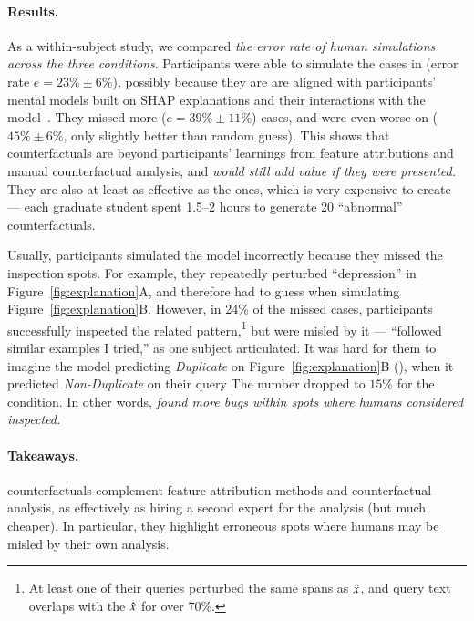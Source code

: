 \paragraph{Results.}
As a within-subject study, we compared \emph{the error rate of human simulations across the three conditions}.
Participants were able to simulate the cases in \crandom (error rate $e=23\%\pm6\%$), possibly because they are are aligned with participants' mental models built on SHAP explanations and their interactions with the model~\cite{miller}.
They missed more \chuman ($e=39\%\pm11\%$) cases, and were even worse on \cshap ($45\%\pm 6\%$, only slightly better than random guess).%
This shows that \cshap counterfactuals are beyond participants' learnings from feature attributions and manual counterfactual analysis, and \emph{would still add value if they were presented.}
They are also at least as effective as the \chuman ones, which is very expensive to create --- each graduate student spent 1.5--2 hours to generate 20 ``abnormal'' counterfactuals.

Usually, participants simulated the model incorrectly because they missed the inspection spots.
For example, they repeatedly perturbed ``depression'' in Figure~\ref{fig:explanation}A, and therefore had to guess when simulating Figure~\ref{fig:explanation}B.
However, in 24\% of the missed \cshap cases, participants successfully inspected the related pattern,\footnote{At least one of their queries perturbed the same spans as $\hat{x}$, and query text overlaps with the $\hat{x}$ for over 70\%.} but were misled by it --- ``followed similar examples I tried,'' as one subject articulated.
It was hard for them to imagine the model predicting \emph{Duplicate} on Figure~\ref{fig:explanation}B (), when it predicted \emph{Non-Duplicate} on their query 
The number dropped to $15\%$ for the \chuman condition.
In other words, \emph{\cshap found more bugs within spots where humans considered inspected.}


\paragraph{Takeaways.}
\sysname counterfactuals complement feature attribution methods and counterfactual analysis, as effectively as hiring a second expert for the analysis (but much cheaper).
In particular, they highlight erroneous spots where humans may be misled by their own analysis.
